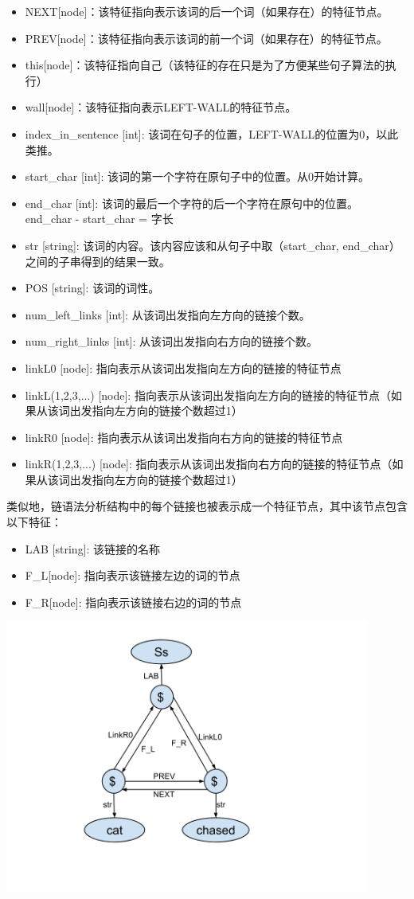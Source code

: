 \begin{itemize}
\item NEXT[node]：该特征指向表示该词的后一个词（如果存在）的特征节点。
\item PREV[node]：该特征指向表示该词的前一个词（如果存在）的特征节点。
\item this[node]：该特征指向自己（该特征的存在只是为了方便某些句子算法的执行）
\item wall[node]：该特征指向表示LEFT-WALL的特征节点。
\item index\_in\_sentence [int]: 该词在句子的位置，LEFT-WALL的位置为0，以此类推。
\item start\_char [int]: 该词的第一个字符在原句子中的位置。从0开始计算。
\item end\_char [int]: 该词的最后一个字符的后一个字符在原句中的位置。 end\_char - start\_char = 字长
\item str [string]: 该词的内容。该内容应该和从句子中取（start\_char, end\_char）之间的子串得到的结果一致。
\item POS [string]: 该词的词性。
\item num\_left\_links [int]: 从该词出发指向左方向的链接个数。
\item num\_right\_links [int]: 从该词出发指向右方向的链接个数。
\item linkL0 [node]: 指向表示从该词出发指向左方向的链接的特征节点
\item linkL(1,2,3,...) [node]: 指向表示从该词出发指向左方向的链接的特征节点（如果从该词出发指向左方向的链接个数超过1）
\item linkR0 [node]: 指向表示从该词出发指向右方向的链接的特征节点
\item linkR(1,2,3,...) [node]: 指向表示从该词出发指向右方向的链接的特征节点（如果从该词出发指向左方向的链接个数超过1）
\end{itemize}

类似地，链语法分析结构中的每个链接也被表示成一个特征节点，其中该节点包含以下特征：

\begin{itemize}
\item LAB [string]: 该链接的名称
\item F\_L[node]: 指向表示该链接左边的词的节点
\item F\_R[node]: 指向表示该链接右边的词的节点
\end{itemize}

\includegraphics[width=12cm]{figures/featureStructure.png}

